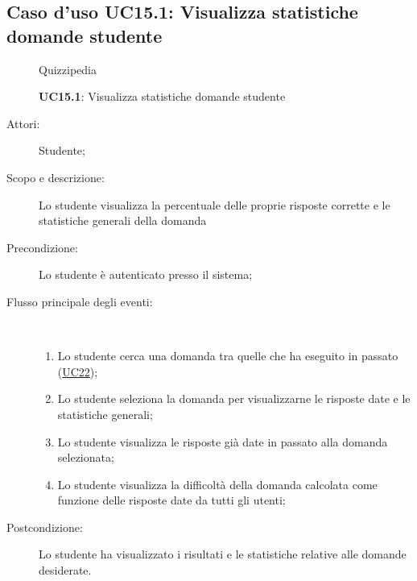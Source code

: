 \subsection{Caso d'uso UC15.1: Visualizza statistiche domande studente}
	\begin{figure}[H]
		\centering
		\begin{resizedtikzpicture}{\textwidth}
		\begin{umlsystem}[x=0, fill=lightgray!20]{Quizzipedia}
		\end{umlsystem}
		\end{resizedtikzpicture}
		\caption{\textbf{UC15.1}: Visualizza statistiche domande studente}
		\label{UC15.1}
	\end{figure}
\begin{description}
\item[Attori:] Studente;
\item[Scopo e descrizione:] Lo studente visualizza la percentuale delle proprie risposte corrette e le statistiche generali della domanda
      \item[Precondizione:] Lo studente è autenticato presso il sistema;

        \item[Flusso principale degli eventi:] \ 
 \begin{enumerate}
          \item Lo studente cerca una domanda tra quelle che ha eseguito in passato (\hyperlink{UC22}{UC22});
          \item Lo studente seleziona la domanda per visualizzarne le risposte date e le statistiche generali;
          \item Lo studente visualizza le risposte già date in passato alla domanda selezionata;
          \item Lo studente visualizza la difficoltà della domanda calcolata come funzione delle risposte date da tutti gli utenti;

      \end{enumerate}
    \item[Postcondizione:] Lo studente ha visualizzato i risultati e le statistiche relative alle domande desiderate.
  \end{description}
\hypertarget{UC15.2}{}
